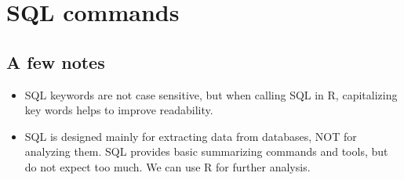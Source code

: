 \documentclass[12pt]{article}
\begin{document}
\section{SQL commands}

\subsection{A few notes}
\begin{itemize}
	\item SQL keywords are not case sensitive, but when calling SQL in R, capitalizing key words helps to improve readability.
	\item SQL is designed mainly for extracting data from databases, NOT for analyzing them. SQL provides basic summarizing commands and tools, but do not expect too much. We can use R for further analysis.
\end{itemize}
\end{document}
